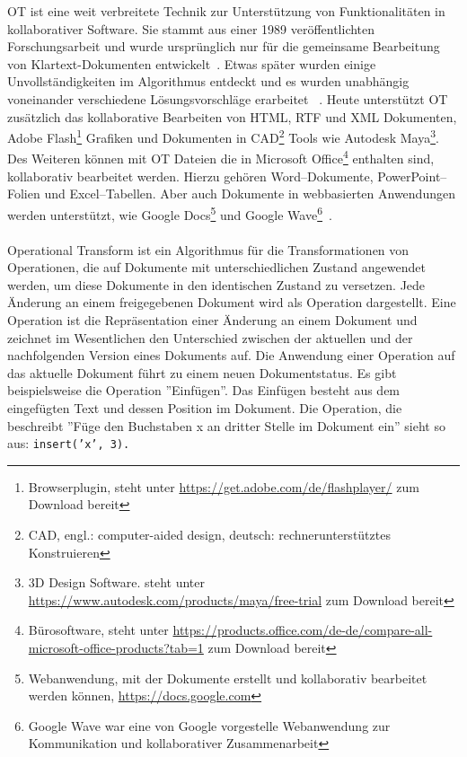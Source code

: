 \def \maya { 3D Design Software. steht unter \url{https://www.autodesk.com/products/maya/free-trial} zum Download bereit}
\def \flash { Browserplugin, steht unter \url{https://get.adobe.com/de/flashplayer/} zum Download bereit}
\def \cad { CAD, engl.: computer-aided design, deutsch: rechnerunterstütztes Konstruieren}
\def \gdocs { Webanwendung, mit der Dokumente erstellt und kollaborativ bearbeitet werden können, \url{https://docs.google.com}}
\def \gwave { Google Wave war eine von Google vorgestelle Webanwendung zur Kommunikation und kollaborativer Zusammenarbeit}
\def \msoffice { Bürosoftware, steht unter \url{https://products.office.com/de-de/compare-all-microsoft-office-products?tab=1} zum Download bereit}
%
\gls{OT} ist eine weit verbreitete Technik zur Unterstützung von Funktionalitäten in \gls{kollaborativ}er Software.
Sie stammt aus einer 1989 veröffentlichten Forschungsarbeit und wurde ursprünglich nur für die gemeinsame Bearbeitung von Klartext-Dokumenten entwickelt~\cite{ot_paper}. Etwas später wurden einige Unvollständigkeiten im Algorithmus entdeckt und es wurden unabhängig voneinander verschiedene Lösungsvorschläge erarbeitet ~\cite{ot-later}.
Heute unterstützt \gls{OT} zusätzlich das \gls{kollaborativ}e Bearbeiten von \gls{HTML}, RTF und XML Dokumenten, Adobe Flash\footnote{\flash} Grafiken und Dokumenten in CAD\footnote{\cad} Tools wie Autodesk Maya\footnote{\maya}.
Des Weiteren können mit \gls{OT} Dateien die in Microsoft Office\footnote{\msoffice} enthalten sind, kollaborativ bearbeitet werden. Hierzu gehören Word--Dokumente, PowerPoint--Folien und Excel--Tabellen.
Aber auch Dokumente in webbasierten Anwendungen werden unterstützt, wie Google Docs\footnote{\gdocs} und Google Wave\footnote{\gwave}~\cite{ot-faq}.\\\\
%
%
Operational Transform ist ein Algorithmus für die Transformationen von Operationen, die auf Dokumente mit unterschiedlichen Zustand angewendet werden, um diese Dokumente in den identischen Zustand zu versetzen.
Jede Änderung an einem freigegebenen Dokument wird als Operation dargestellt.
Eine Operation ist die Repräsentation einer Änderung an einem Dokument und zeichnet im Wesentlichen den Unterschied zwischen der aktuellen und der nachfolgenden Version eines Dokuments auf.
Die Anwendung einer Operation auf das aktuelle Dokument führt zu einem neuen Dokumentstatus.
Es gibt beispielsweise die Operation ''Einfügen''. 
Das Einfügen besteht aus dem eingefügten Text und dessen Position im Dokument. Die Operation, die beschreibt ''Füge den Buchstaben x an dritter Stelle im Dokument ein'' sieht so aus: \tt{insert('x', 3)}.

